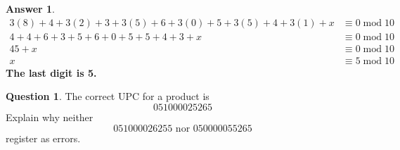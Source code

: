 \documentclass[article, 12pt]{article}
\theoremstyle{definition}
\newtheorem{question}{Question}
\newtheorem{answer}{Answer}
\newcommand{\Mod}[1]{\;\mathrm{mod}\; #1} %
\begin{document}
    \begin{answer}
        \begin{align*}
            3(8) + 4 + 3(2) + 3 + 3(5) + 6 + 3(0) + 5 + 3(5) + 4 + 3(1) + x &\equiv 0 \Mod{10} \\
            4 + 4 + 6 + 3 + 5 + 6 + 0 + 5 + 5 + 4 + 3 + x &\equiv 0 \Mod{10} \\
            45 + x &\equiv 0 \Mod{10} \\
            x &\equiv 5 \Mod{10}
        \end{align*}
        \pushQED{\qed} \textbf{The last digit is 5.} \qedhere
    \end{answer}
    \begin{question}
        The correct UPC for a product is
        \[ 051000025265 \]
        Explain why neither
        \[ 051000026255 \text{ nor } 050000055265 \]
        register as errors.
    \end{question}
\end{document}
